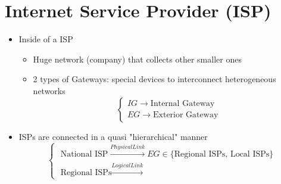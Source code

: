 \section{Internet Service Provider (ISP)}
\begin{itemize}
\item Inside of a ISP
\begin{itemize}
\item Huge network (company) that collects other smaller ones
\item 2 types of Gateways: special devices to interconnect heterogeneous networks
\begin{equation}
\begin{cases}
IG \rightarrow \text{Internal Gateway}\\
EG \rightarrow \text{Exterior Gateway}
\end{cases}
\end{equation}
\end{itemize}
\item ISPs are connected in a quasi "hierarchical" manner
\begin{equation}
\begin{cases}
\text{ National ISP} \stackrel{Physical Link}{\longrightarrow} EG \in \text{$\{$Regional ISPs, Local ISPs$\}$}\\
\text{ Regional ISPs} \stackrel{Logical Link}{\longrightarrow}
\end{cases}
\end{equation}
\end{itemize}


